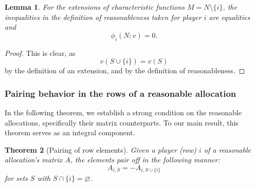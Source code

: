 \documentclass[12pt,letterpaper,final]{article}
\theoremstyle{plain}
\newtheorem{theorem}{Theorem}[section]
\theoremstyle{plain}
\theoremstyle{plain}
\newtheorem{lemma}[theorem]{Lemma}
\theoremstyle{plain}
\theoremstyle{plain}
\theoremstyle{plain}
\theoremstyle{plain}
\theoremstyle{definition}
\theoremstyle{definition}
\theoremstyle{definition}
\theoremstyle{definition}
\theoremstyle{definition}
\theoremstyle{remark}
\theoremstyle{remark}
\theoremstyle{remark}
\theoremstyle{remark}
\begin{document}
\begin{lemma}
  For the extensions of characteristic functions
  \(M=N\setminus\{i\}\), the inequalities in the definition of
  reasonableness taken for player \(i\)
  are equalities and
  \[
    \phi_i(N;v) = 0.
  \]
\end{lemma}

\begin{proof}
  This is clear, as \[v(S\cup \{i\}) = v(S)\]
  by the definition of an extension, and by the definition of reasonableness.
\end{proof}

\subsubsection{Pairing behavior in the rows of a reasonable allocation}

In the following theorem, we establish a strong condition on the
reasonable allocations, specifically their matrix counterparts. To our main
result, this theorem serves as an integral component.

\begin{theorem}[Pairing of row elements]\label{thm:rowWisePairing}
  Given a player (row) \(i\)  of a reasonable allocation's matrix
  \(A\), the elements pair off in the following manner:
  \begin{equation*}
    A_{i,S} = -A_{i,S\cup\{i\}}
  \end{equation*}
  for sets \(S\) with \(S \cap \{i\} = \varnothing\).
\end{theorem}
\end{document}
